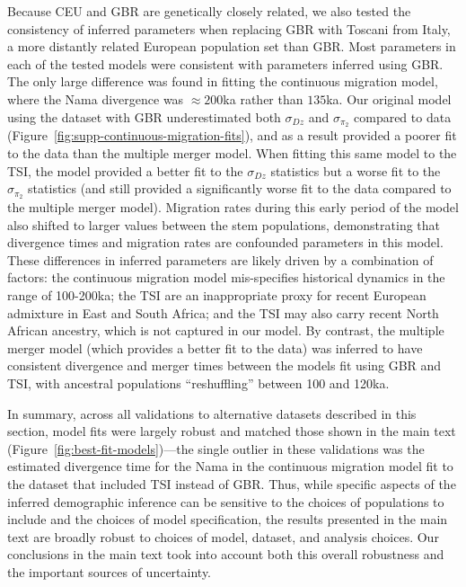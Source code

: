 \documentclass[]{article}
\begin{document}
Because CEU and GBR are genetically closely related, we also tested the
consistency of inferred parameters when replacing GBR with Toscani from Italy,
a more distantly related European population set than GBR. Most parameters in
each of the tested models were consistent with parameters inferred using GBR.
The only large difference was found in fitting the continuous migration model,
where the Nama divergence was $\approx200$ka rather than $135$ka. Our original
model using the dataset with GBR underestimated both $\sigma_{Dz}$ and
$\sigma_{\pi_2}$ compared to data
(Figure~\ref{fig:supp-continuous-migration-fits}), and as a result provided a
poorer fit to the data than the multiple merger model. When fitting this same
model to the TSI, the model provided a better fit to the $\sigma_{Dz}$
statistics but a worse fit to the $\sigma_{\pi_2}$ statistics (and still
provided a significantly worse fit to the data compared to the multiple
merger model). Migration rates during this early period of the model also
shifted to larger values between the stem populations, demonstrating that
divergence times and migration rates are confounded parameters in this model.
These differences in inferred parameters are likely driven by a combination of
factors: the continuous migration model mis-specifies historical dynamics in
the range of 100-200ka; the TSI are an inappropriate proxy for recent European
admixture in East and South Africa; and the TSI may also carry recent North
African ancestry, which is not captured in our model. By contrast, the
multiple merger model (which provides a better fit to the data) was inferred to
have consistent divergence and merger times between the models fit using GBR
and TSI, with ancestral populations ``reshuffling'' between 100 and 120ka.

In summary, across all validations to alternative datasets described in this
section, model fits were largely robust and matched those shown in the main
text (Figure~\ref{fig:best-fit-models})---the single outlier in these
validations was the estimated divergence time for the Nama in the continuous
migration model fit to the dataset that included TSI instead of GBR. Thus,
while specific aspects of the inferred demographic inference can be sensitive
to the choices of populations to include and the choices of model
specification, the results presented in the main text are broadly robust to
choices of model, dataset, and analysis choices. Our conclusions in the main
text took into account both this overall robustness and the important sources
of uncertainty. 
\end{document}
